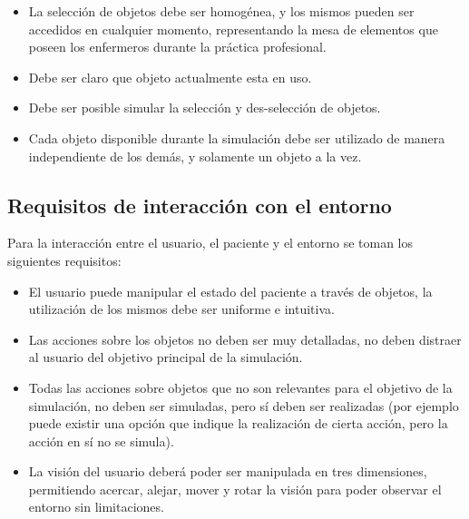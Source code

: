 \begin{itemize}

\item La selección de objetos debe ser homogénea, y los mismos pueden ser
    accedidos en cualquier momento, representando la mesa de elementos que
    poseen los enfermeros durante la práctica profesional.

\item Debe ser claro que objeto actualmente esta en uso.

\item Debe ser posible simular la selección y des-selección de objetos.

\item Cada objeto disponible durante la simulación debe ser utilizado de
    manera independiente de los demás, y solamente un objeto a la vez.

\end{itemize}

\subsection{Requisitos de interacción con el entorno}

Para la interacción entre el usuario, el paciente y el entorno se toman los
siguientes requisitos:

\begin{itemize}
\item El usuario puede manipular el estado del paciente a través de objetos, la
    utilización de los mismos debe ser uniforme e intuitiva.

\item Las acciones sobre los objetos no deben ser muy detalladas, no deben
    distraer al usuario del objetivo principal de la simulación.

\item Todas las acciones sobre objetos que no son relevantes para el objetivo de
    la simulación, no deben ser simuladas, pero sí deben ser realizadas (por
    ejemplo puede existir una opción que indique la realización de cierta
    acción, pero la acción en sí no se simula).

\item La visión del usuario deberá poder ser manipulada en tres dimensiones,
    permitiendo acercar, alejar, mover y rotar la visión para poder observar el
    entorno sin limitaciones.

\end{itemize}

